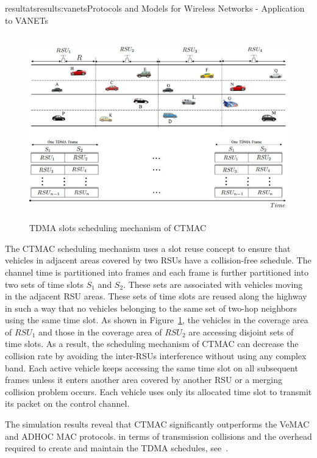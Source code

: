 \documentclass{ra2016}
\begin{document}
\begin{module}{resultats}{results:vanets}{Protocols and Models for Wireless Networks - Application to VANETs}
\begin{figure}[!htbp]
    \begin{center}
        \includegraphics[height=8cm,width=14cm]{IMG/CTMACprinciple.png}
        \caption{TDMA slots scheduling mechanism of CTMAC}
        \label{fig:CTSA}
    \end{center}
\end{figure}

The CTMAC scheduling mechanism uses a slot reuse concept 
to ensure that vehicles in adjacent areas covered by two RSUs have 
a collision-free schedule. The channel time is partitioned into frames and
each frame is further partitioned into two sets of time slots $S_1$ and $S_2$. 
These sets are associated with vehicles moving in the adjacent RSU areas. 
These sets of time slots are reused along the highway in such a way that no vehicles belonging to 
the same set of two-hop 
neighbors using the same time slot. As shown in Figure~\ref{fig:CTSA}, the vehicles in 
the coverage area of $RSU_1$ and those in the coverage area of $RSU_2$ are
accessing disjoint sets of time slots. As a result, the scheduling mechanism of 
CTMAC can decrease the collision rate by avoiding the inter-RSUs interference 
without using any complex band.  Each active vehicle keeps accessing the same 
time slot on all subsequent frames unless it enters another area covered by another 
RSU or a merging collision problem occurs. Each vehicle uses only its allocated 
time slot to transmit its packet on the control channel.

The simulation results
reveal that CTMAC significantly outperforms the VeMAC and
ADHOC MAC protocols. in terms of transmission collisions
and the overhead required to create and maintain the TDMA
schedules, see~\cite{hadded:hal-01379219}. 


\end{module}
\end{document}
